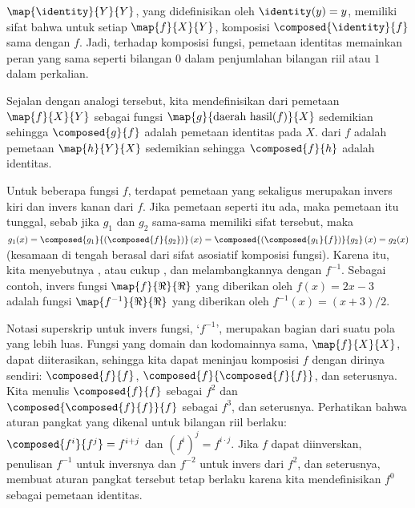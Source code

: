 \( \map{\identity}{Y}{Y} \), yang didefinisikan oleh
\( \identity(y)=y \), memiliki sifat bahwa untuk setiap
\( \map{f}{X}{Y} \), komposisi \( \composed{\identity}{f} \) sama dengan
\( f \).
Jadi, terhadap komposisi fungsi, pemetaan identitas memainkan peran yang sama
seperti bilangan \( 0 \) dalam penjumlahan bilangan riil atau \( 1 \) dalam
perkalian.

Sejalan dengan analogi tersebut, kita mendefinisikan
dari pemetaan \( \map{f}{X}{Y} \) sebagai fungsi
\( \map{g}{\text{daerah hasil}(f)}{X} \) sedemikian sehingga
\( \composed{g}{f} \) adalah pemetaan identitas pada \( X \).
dari \( f \) adalah pemetaan \( \map{h}{Y}{X} \) sedemikian sehingga
\( \composed{f}{h} \) adalah identitas.

Untuk beberapa fungsi $f$, terdapat pemetaan yang sekaligus merupakan invers
kiri dan invers kanan dari \( f \).
Jika pemetaan seperti itu ada, maka pemetaan itu tunggal, sebab jika
\( g_1 \) dan \( g_2 \) sama-sama memiliki sifat tersebut, maka
\( g_1(x)=\composed{g_1}{ (\composed{f}{g_2}) }\,(x)
         =\composed{ (\composed{g_1}{f}) }{g_2}\,(x)
         =g_2(x) \)
(kesamaan di tengah berasal dari sifat asosiatif komposisi fungsi).
Karena itu, kita menyebutnya , atau cukup
,
dan melambangkannya dengan \( f^{-1} \).
Sebagai contoh, invers fungsi \( \map{f}{\Re}{\Re} \) yang diberikan oleh
\( f(x)=2x-3 \) adalah fungsi \( \map{f^{-1}}{\Re}{\Re} \) yang diberikan
oleh \( f^{-1}(x)=(x+3)/2 \).

Notasi superskrip untuk invers fungsi, `\( f^{-1} \)', merupakan bagian dari
suatu pola yang lebih luas.
Fungsi yang domain dan kodomainnya sama, $\map{f}{X}{X}$, dapat diiterasikan,
sehingga kita dapat meninjau komposisi $f$ dengan dirinya sendiri:
\( \composed{f}{f} \), \( \composed{f}{\composed{f}{f}} \), dan seterusnya.
Kita menulis $\composed{f}{f}$ sebagai \( f^2 \) dan
$\composed{\composed{f}{f}}{f}$ sebagai \( f^3 \), dan seterusnya.
Perhatikan bahwa aturan pangkat yang dikenal untuk bilangan riil berlaku:
\( \composed{f^i}{f^j}=f^{i+j} \) dan \( (f^i)^j=f^{i\cdot j} \).
Jika \( f \) dapat diinverskan, penulisan \( f^{-1} \) untuk inversnya dan
\( f^{-2} \) untuk invers dari \( f^2 \), dan seterusnya, membuat aturan
pangkat tersebut tetap berlaku karena kita mendefinisikan \( f^0 \) sebagai
pemetaan identitas.

